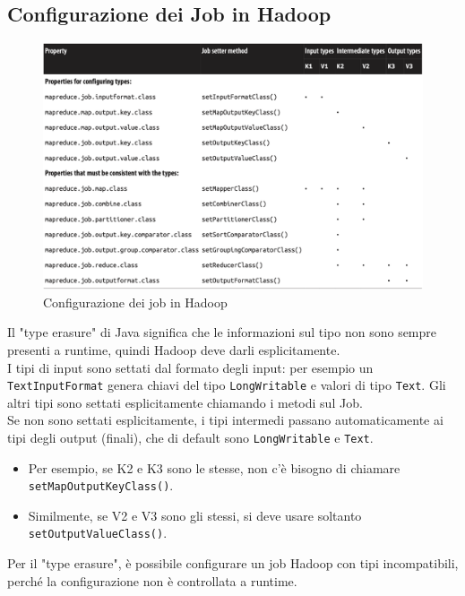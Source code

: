 \documentclass{article}
\begin{document}
\begin{appendices}
\subsection{Configurazione dei Job in Hadoop}
\begin{figure}[H]
    \centering
    \includegraphics[scale=0.4]{img/Configurazione job hadoop.png}
    \caption{Configurazione dei job in Hadoop}
\end{figure}\noindent
Il "type erasure" di Java significa che le informazioni sul tipo non sono sempre presenti a runtime, quindi Hadoop deve darli esplicitamente. \\
I tipi di input sono settati dal formato degli input: per esempio un \texttt{TextInputFormat} genera chiavi del tipo \texttt{LongWritable} e valori di tipo \texttt{Text}. Gli altri tipi sono settati esplicitamente chiamando i metodi sul Job. \\
Se non sono settati esplicitamente, i tipi intermedi passano automaticamente ai tipi degli output (finali), che di default sono \texttt{LongWritable} e \texttt{Text}.
\begin{itemize}
    \item Per esempio, se K2 e K3 sono le stesse, non c'è bisogno di chiamare \texttt{setMapOutputKeyClass()}.
    \item Similmente, se V2 e V3 sono gli stessi, si deve usare soltanto \texttt{setOutputValueClass()}.
\end{itemize}
Per il "type erasure", è possibile configurare un job Hadoop con tipi incompatibili, perché la configurazione non è controllata a runtime.


\end{appendices}
\end{document}

